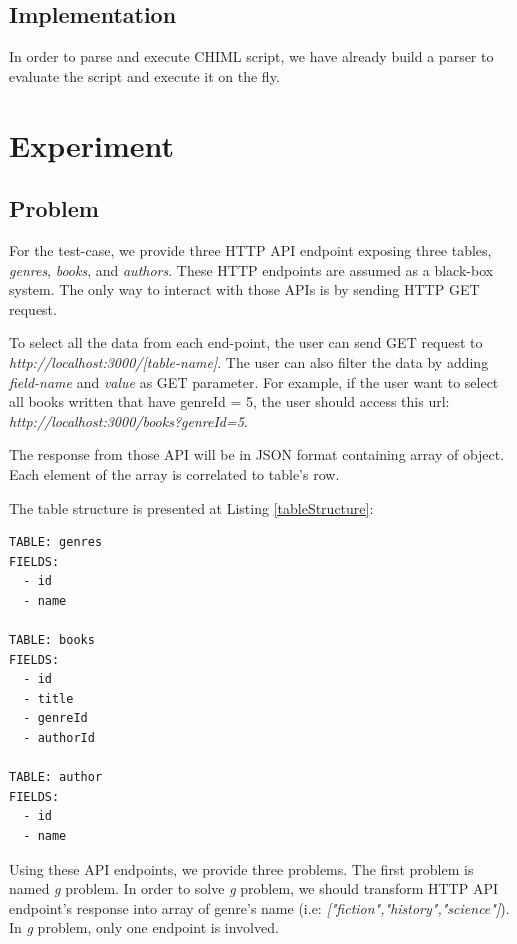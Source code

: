 \documentclass[conference]{IEEEtran}
\begin{document}
\subsection{Implementation}
In order to parse and execute CHIML script, we have already build a parser to evaluate the script and execute it on the fly.

\section{Experiment}

\subsection{Problem}

For the test-case, we provide three HTTP API endpoint exposing three tables, {\it genres}, {\it books}, and {\it authors}. These HTTP endpoints are assumed as a black-box system. The only way to interact with those APIs is by sending HTTP GET request.

To select all the data from each end-point, the user can send GET request to {\it http://localhost:3000/[table-name]}. The user can also filter the data by adding {\it field-name} and {\it value} as GET parameter. For example, if the user want to select all books written that have genreId = 5, the user should access this url: {\it http://localhost:3000/books?genreId=5}.

The response from those API will be in JSON format containing array of object. Each element of the array is correlated to table's row.

The table structure is presented at Listing \ref{tableStructure}:

\begin{lstlisting}[caption=Testcase Table Structure, label=tableStructure, basicstyle=\footnotesize, breaklines=true]
TABLE: genres
FIELDS:
  - id
  - name

TABLE: books
FIELDS:
  - id
  - title
  - genreId
  - authorId

TABLE: author
FIELDS:
  - id
  - name
\end{lstlisting}

Using these API endpoints, we provide three problems. The first problem is named {\it g} problem. In order to solve {\it g} problem, we should transform HTTP API endpoint's response into array of genre's name (i.e: {\it ["fiction","history","science"]}). In {\it g} problem, only one endpoint is involved.
\end{document}

